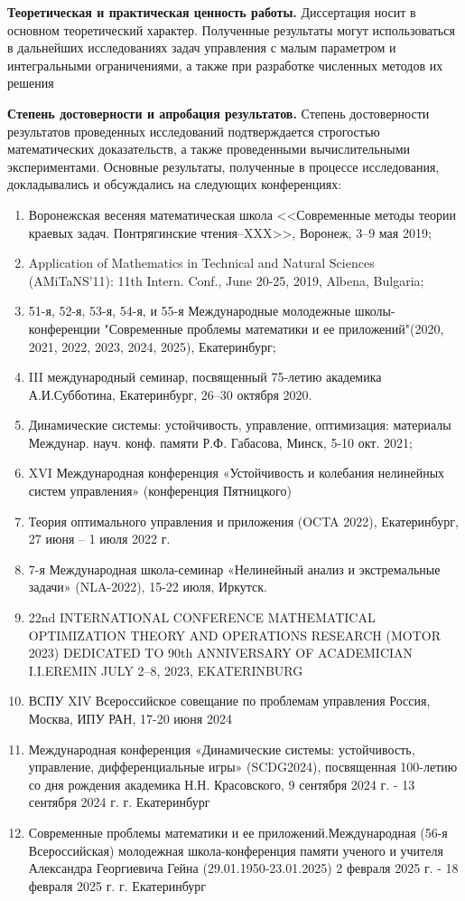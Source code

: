 \documentclass[../main.tex]{subfiles}
\begin{document}
\textbf{Теоретическая и практическая ценность работы.} Диссертация носит в основном теоретический характер.
Полученные результаты могут использоваться в дальнейших исследованиях задач управления с малым параметром и интегральными ограничениями, а также при разработке численных методов их решения

\textbf{Степень достоверности и апробация результатов.}  Степень достоверности результатов проведенных исследований подтверждается строгостью математических доказательств, а также проведенными вычислительными экспериментами.
Основные результаты, полученные в процессе исследования, докладывались и обсуждались на следующих конференциях:
\begin{enumerate}
	\item Воронежская весеняя математическая школа <<Современные методы теории краевых задач. Понтрягинские чтения–XXX>>, Воронеж, 3–9 мая 2019;
	\item Application of Mathematics in Technical and Natural Sciences (AMiTaNS'11): 11th Intern. Conf., June 20-25, 2019, Albena, Bulgaria;
	\item 51-я, 52-я, 53-я, 54-я, и 55-я Международные молодежные школы-конференции "Современные проблемы математики и ее приложений"(2020, 2021, 2022, 2023, 2024, 2025), Екатеринбург;
	\item III международный семинар, посвященный 75-летию академика А.И.Субботина, Екатеринбург, 26–30 октября 2020.
	\item Динамические системы: устойчивость, управление, оптимизация: материалы Междунар. науч. конф. памяти Р.Ф. Габасова, Минск, 5-10 окт. 2021;
	\item XVI Международная конференция «Устойчивость и колебания нелинейных систем управления» (конференция Пятницкого) 
	\item Теория оптимального управления и приложения (OCTA 2022),
	Екатеринбург, 27 июня – 1 июля 2022 г.
	\item 7-я Международная школа-семинар  «Нелинейный анализ и экстремальные задачи» (NLA-2022), 15-22 июля, Иркутск.
	\item 22nd INTERNATIONAL CONFERENCE MATHEMATICAL OPTIMIZATION THEORY AND OPERATIONS RESEARCH
	(MOTOR 2023) DEDICATED TO 90th ANNIVERSARY OF ACADEMICIAN I.I.EREMIN JULY 2–8, 2023, EKATERINBURG
	\item ВСПУ  XIV Всероссийское совещание по проблемам управления Россия, Москва, ИПУ РАН, 17-20 июня 2024
	\item Международная конференция «Динамические системы: устойчивость, управление, дифференциальные игры» (SCDG2024), посвященная 100-летию со дня рождения академика Н.Н. Красовского, 9 сентября 2024 г. - 13 сентября 2024 г.  г. Екатеринбург
	\item Современные проблемы математики и ее приложений.Международная (56-я Всероссийская) молодежная школа-конференция памяти ученого и учителя Александра Георгиевича Гейна (29.01.1950-23.01.2025) 2 февраля 2025 г. - 18 февраля 2025 г.
	г. Екатеринбург
\end{enumerate}
\end{document}
